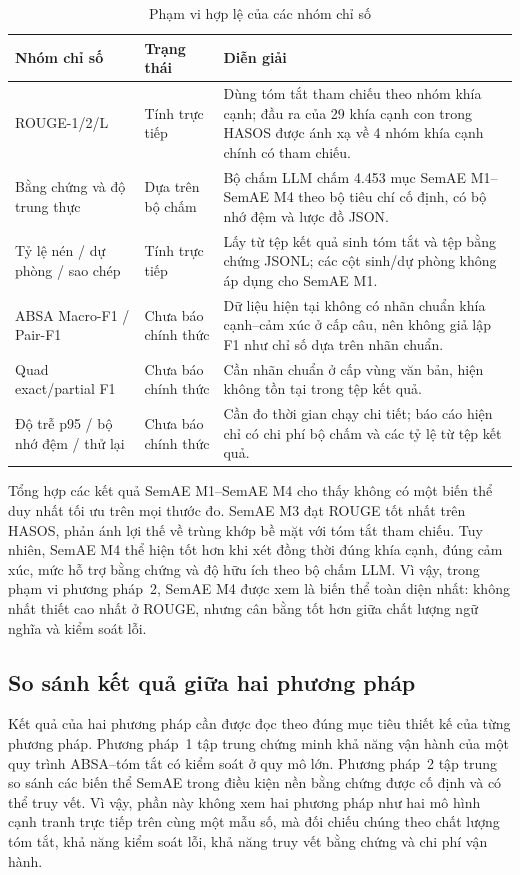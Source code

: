 \begin{table}[tbp]
\centering
\caption{Phạm vi hợp lệ của các nhóm chỉ số}
\label{tab:metric-availability}
\begin{tabularx}{\textwidth}{L{0.23\textwidth} L{0.20\textwidth} Y}
\toprule
\textbf{Nhóm chỉ số} & \textbf{Trạng thái} & \textbf{Diễn giải} \\
\midrule
ROUGE-1/2/L & Tính trực tiếp & Dùng tóm tắt tham chiếu theo nhóm khía cạnh; đầu ra của 29 khía cạnh con trong HASOS được ánh xạ về 4 nhóm khía cạnh chính có tham chiếu. \\
Bằng chứng và độ trung thực & Dựa trên bộ chấm & Bộ chấm LLM chấm 4.453 mục SemAE M1--SemAE M4 theo bộ tiêu chí cố định, có bộ nhớ đệm và lược đồ JSON. \\
Tỷ lệ nén / dự phòng / sao chép & Tính trực tiếp & Lấy từ tệp kết quả sinh tóm tắt và tệp bằng chứng JSONL; các cột sinh/dự phòng không áp dụng cho SemAE M1. \\
ABSA Macro-F1 / Pair-F1 & Chưa báo chính thức & Dữ liệu hiện tại không có nhãn chuẩn khía cạnh--cảm xúc ở cấp câu, nên không giả lập F1 như chỉ số dựa trên nhãn chuẩn. \\
Quad exact/partial F1 & Chưa báo chính thức & Cần nhãn chuẩn ở cấp vùng văn bản, hiện không tồn tại trong tệp kết quả. \\
Độ trễ p95 / bộ nhớ đệm / thử lại & Chưa báo chính thức & Cần đo thời gian chạy chi tiết; báo cáo hiện chỉ có chi phí bộ chấm và các tỷ lệ từ tệp kết quả. \\
\bottomrule
\end{tabularx}
\end{table}


Tổng hợp các kết quả SemAE M1--SemAE M4 cho thấy không có một biến thể duy nhất tối ưu trên mọi thước đo. SemAE M3 đạt ROUGE tốt nhất trên HASOS, phản ánh lợi thế về trùng khớp bề mặt với tóm tắt tham chiếu. Tuy nhiên, SemAE M4 thể hiện tốt hơn khi xét đồng thời đúng khía cạnh, đúng cảm xúc, mức hỗ trợ bằng chứng và độ hữu ích theo bộ chấm LLM. Vì vậy, trong phạm vi phương pháp~2, SemAE M4 được xem là biến thể toàn diện nhất: không nhất thiết cao nhất ở ROUGE, nhưng cân bằng tốt hơn giữa chất lượng ngữ nghĩa và kiểm soát lỗi.

\subsection{So sánh kết quả giữa hai phương pháp}

Kết quả của hai phương pháp cần được đọc theo đúng mục tiêu thiết kế của từng phương pháp. Phương pháp~1 tập trung chứng minh khả năng vận hành của một quy trình ABSA--tóm tắt có kiểm soát ở quy mô lớn. Phương pháp~2 tập trung so sánh các biến thể SemAE trong điều kiện nền bằng chứng được cố định và có thể truy vết. Vì vậy, phần này không xem hai phương pháp như hai mô hình cạnh tranh trực tiếp trên cùng một mẫu số, mà đối chiếu chúng theo chất lượng tóm tắt, khả năng kiểm soát lỗi, khả năng truy vết bằng chứng và chi phí vận hành.

